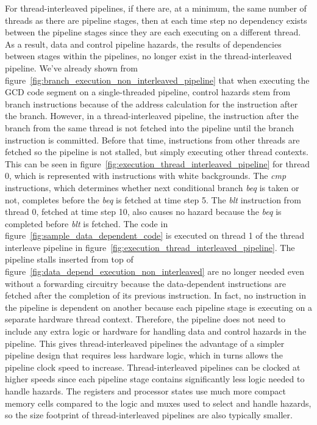 For thread-interleaved pipelines, if there are, at a minimum, the same number of threads as there are pipeline stages, then at each time step no dependency exists between the pipeline stages since they are each executing on a different thread. 
As a result, data and control pipeline hazards, the results of dependencies between stages within the pipelines, no longer exist in the thread-interleaved pipeline.    
We've already shown from figure~\ref{fig:branch_execution_non_interleaved_pipeline} that when executing the GCD code segment on a single-threaded pipeline, control hazards stem from branch instructions because of the address calculation for the instruction after the branch.
However, in a thread-interleaved pipeline, the instruction after the branch from the same thread is not fetched into the pipeline until the branch instruction is committed.
Before that time, instructions from other threads are fetched so the pipeline is not stalled, but simply executing other thread contexts.
This can be seen in figure~\ref{fig:execution_thread_interleaved_pipeline} for thread 0, which is represented with instructions with white backgrounds.
The \emph{cmp} instructions, which determines whether next conditional branch \emph{beq} is taken or not, completes before the \emph{beq} is fetched at time step 5.
The \emph{blt} instruction from thread 0, fetched at time step 10, also causes no hazard because the \emph{beq} is completed before \emph{blt} is fetched.
The code in figure~\ref{fig:sample_data_dependent_code} is executed on thread 1 of the thread interleave pipeline in figure~\ref{fig:execution_thread_interleaved_pipeline}.
The pipeline stalls inserted from top of figure~\ref{fig:data_depend_execution_non_interleaved} are no longer needed even without a forwarding circuitry because the data-dependent instructions are fetched after the completion of its previous instruction.
In fact, no instruction in the pipeline is dependent on another because each pipeline stage is executing on a separate hardware thread context.
Therefore, the pipeline does not need to include any extra logic or hardware for handling data and control hazards in the pipeline. 
This gives thread-interleaved pipelines the advantage of a simpler pipeline design that requires less hardware logic, which in turns allows the pipeline clock speed to increase.
Thread-interleaved pipelines can be clocked at higher speeds since each pipeline stage contains significantly less logic needed to handle hazards.
The registers and processor states use much more compact memory cells compared to the logic and muxes used to select and handle hazards, so the size footprint of thread-interleaved pipelines are also typically smaller.

